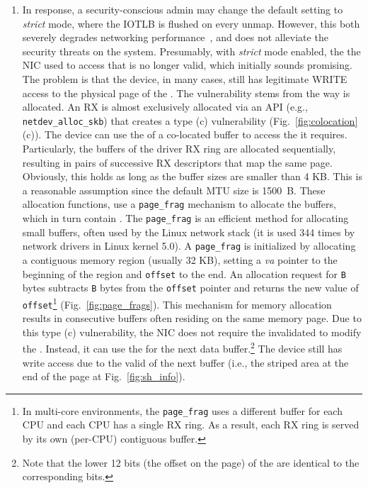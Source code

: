 \begin{enumerate}[label=(\roman*),wide, labelwidth=!, labelindent=0pt]
\item In response, a security-conscious admin may change the default setting to \emph{strict} mode, where the IOTLB is flushed on every unmap. However, this both severely degrades networking performance~\cite{MMT16,MSMT18}, and does not alleviate the security threats on the system. Presumably, with \emph{strict} mode enabled, the \iova{} the NIC used to access that \shinfo{} is no longer valid, which initially sounds promising. The problem is that the device, in many cases, still has legitimate WRITE access to the physical page of the \shinfo. The vulnerability stems from the way \data{} is allocated. An RX \skb{} is almost exclusively allocated via an API (e.g., \texttt{netdev\_alloc\_skb}) that creates a type (c) \subpage{} vulnerability (Fig.~\ref{fig:colocation}(c)). The device can use the \iova{} of a co-located buffer to access the \shinfo{} it requires. Particularly, the buffers of the driver RX ring are allocated sequentially, resulting in pairs of successive RX descriptors that map the same page. Obviously, this holds as long as the buffer sizes are smaller than 4 KB. This is a reasonable assumption since the default MTU size is 1500~B. These allocation functions, use a \texttt{page\_frag} mechanism to allocate the \data{} buffers, which in turn contain \shinfo. The \texttt{page\_frag} is an efficient method for allocating small buffers, often used by the Linux network stack (it is used 344 times by network drivers in Linux kernel 5.0). A \texttt{page\_frag} is initialized by allocating a contiguous memory region (usually 32 KB), setting a \textit{va} pointer to the beginning of the region and \texttt{offset} to the end. An allocation request for \texttt{B} bytes subtracts \texttt{B} bytes from the \texttt{offset} pointer and returns the new value of \texttt{offset}\footnote{In multi-core environments, the \texttt{page\_frag} uses a different buffer for each CPU and each CPU has a single RX ring. As a result, each RX ring is served by its own (per-CPU) contiguous buffer.} (Fig.~\ref{fig:page_frags}). This mechanism for memory allocation results in consecutive \data{} buffers often residing on the same memory page. Due to this type (c) \subpage{} vulnerability, the NIC does not require the invalidated \iova{} to modify the \shinfo. Instead, it can use the \iova{} for the next data buffer.\footnote{Note that the lower 12 bits (the offset on the page) of the \iova{} are identical to the corresponding \kva{} bits.} The device still has write access due to the valid \iova of the next buffer (i.e., the striped area at the end of the page at Fig.~\ref{fig:sh_info}).
\end{enumerate}

